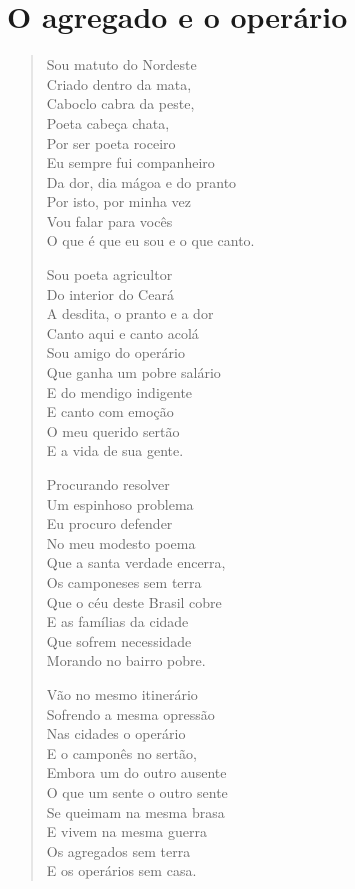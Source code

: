 \chapter{O agregado e o operário}

\begin{verse}
Sou matuto do Nordeste\\
Criado dentro da mata,\\
Caboclo cabra da peste,\\
Poeta cabeça chata,\\
Por ser poeta roceiro\\
Eu sempre fui companheiro\\
Da dor, dia mágoa e do pranto\\
Por isto, por minha vez\\
Vou falar para vocês\\
O que é que eu sou e o que canto.

Sou poeta agricultor\\
Do interior do Ceará\\
A desdita, o pranto e a dor\\
Canto aqui e canto acolá\\
Sou amigo do operário\\
Que ganha um pobre salário\\
E do mendigo indigente\\
E canto com emoção\\
O meu querido sertão\\
E a vida de sua gente.

Procurando resolver\\
Um espinhoso problema\\
Eu procuro defender\\
No meu modesto poema\\
Que a santa verdade encerra,\\
Os camponeses sem terra\\
Que o céu deste Brasil cobre\\
E as famílias da cidade\\
Que sofrem necessidade\\
Morando no bairro pobre.

Vão no mesmo itinerário\\
Sofrendo a mesma opressão\\
Nas cidades o operário\\
E o camponês no sertão,\\
Embora um do outro ausente\\
O que um sente o outro sente\\
Se queimam na mesma brasa\\
E vivem na mesma guerra\\
Os agregados sem terra\\
E os operários sem casa.


\end{verse}
